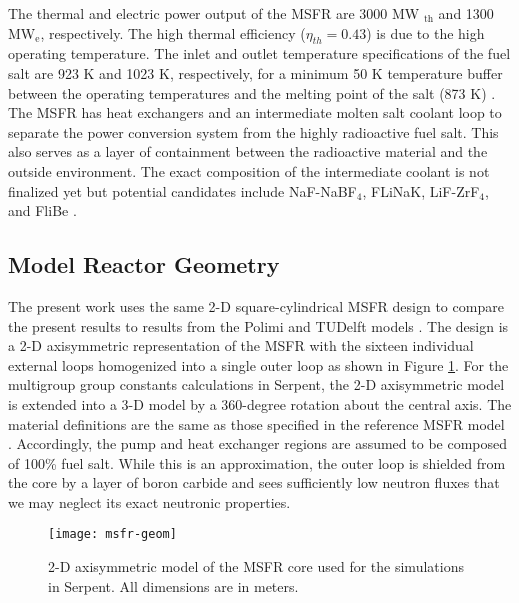 The thermal and electric power output of the \gls{MSFR} are 3000 MW
$_{\text{th}}$ and 1300 MW$_{\text{e}}$, respectively. The high thermal
efficiency ($\eta_{th}=0.43$) is due to the high operating
temperature. The inlet and outlet temperature
specifications of the fuel salt are 923 K and 1023 K, respectively, for a
minimum 50 K temperature buffer between the
operating temperatures and the melting point of the salt (873 K)
\cite{euratom_final_2015}. The \gls{MSFR} has heat exchangers and an
intermediate molten salt coolant loop to separate the power
conversion system from the highly radioactive fuel salt. This also serves as
a layer of containment between the radioactive material and the outside
environment. The exact composition of the intermediate coolant is not
finalized yet but potential candidates include NaF-NaBF$_4$, FLiNaK,
LiF-ZrF$_4$, and FliBe \cite{merle_concept_2017}.

\subsection{Model Reactor Geometry}

The present work uses the same 2-D square-cylindrical \gls{MSFR} design to
compare the present results to results from the Polimi and TUDelft models
\cite{fiorina_modelling_2014}. The design is a 2-D axisymmetric representation
of the \gls{MSFR} with the sixteen individual external loops homogenized into
a single outer loop as shown in Figure \ref{fig:msfrgeom}. For the multigroup
group constants calculations in Serpent, the 2-D axisymmetric model is
extended into a 3-D model by a 360-degree rotation about the
central axis. The material definitions are the same as those specified in the
reference \gls{MSFR} model \cite{brovchenko_neutronic_2019}. Accordingly, the
pump and heat exchanger regions
are assumed to be composed of 100\% fuel salt. While this is an approximation,
the outer loop is shielded from the core by a layer of boron carbide and sees
sufficiently low neutron fluxes that we may neglect its exact neutronic
properties.
%
\begin{figure}[t!] 
	\centering
	\texttt{[image: msfr-geom]}
	\caption{2-D axisymmetric model of the \gls{MSFR} core used for the
	simulations in Serpent. All dimensions are in meters.
	\cite{brovchenko_neutronic_2019}}
	\label{fig:msfrgeom}
\end{figure}

